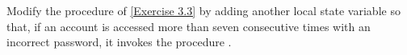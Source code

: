 \begin{exercise}
	\label{Exercise 3.4}
	Modify the  procedure of \cref{Exercise 3.3} by adding another local state variable so that, if an account is accessed more than seven consecutive times with an incorrect password, it invokes the procedure .
\end{exercise}
